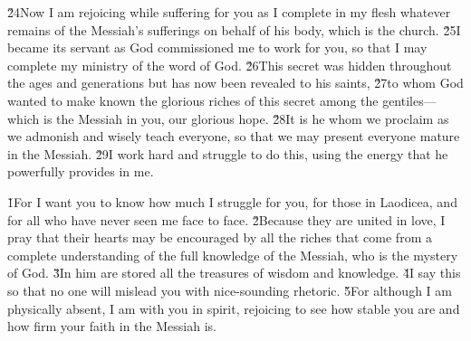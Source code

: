 \v{24}Now I am rejoicing while suffering for you as I complete in my flesh whatever remains of the Messiah's sufferings on behalf of his body, which is the church. \v{25}I became its servant as God commissioned me to work for you, so that I may complete my ministry of the word of God. \v{26}This secret was hidden throughout the ages and generations but has now been revealed to his saints, \v{27}to whom God wanted to make known the glorious riches of this secret among the gentiles---which is the Messiah in you, our glorious hope. \v{28}It is he whom we proclaim as we admonish and wisely teach everyone, so that we may present everyone mature in the Messiah. \v{29}I work hard and struggle to do this, using the energy that he powerfully provides in me.

\v{1}For I want you to know how much I struggle for you, for those in Laodicea, and for all who have never seen me face to face. \v{2}Because they are united in love, I pray that their hearts may be encouraged by all the riches that come from a complete understanding of the full knowledge of the Messiah, who is the mystery of God. \v{3}In him are stored all the treasures of wisdom and knowledge. \v{4}I say this so that no one will mislead you with nice-sounding rhetoric. \v{5}For although I am physically absent, I am with you in spirit, rejoicing to see how stable you are and how firm your faith in the Messiah is.

